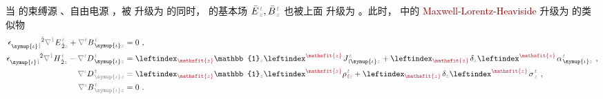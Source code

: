 当  的束缚源 、自由电源 ，被  升级为  的同时， 的基本场 $\bar{E}^{\;\!\mathcolor{gray}{t}}_{\;\!\mathcolor{gray}{z}}, \bar{B}^{\;\!\mathcolor{gray}{t}}_{\;\!\mathcolor{gray}{z}}$ 也被上面  升级为 。此时， 中的 \textcolor{Maroon}{Maxwell-Lorentz-Heaviside}  升级为  的类似物
\begin{subequations} \label{eq:curl-EH}
\begin{align}
	\epsilon^{\hphantom{\symup{\iota}\hat{1}}\hat{2}}_{\symup{\iota}\mathcolor{gray}{\hat{1}}} \mathcolor{gray}{\nabla^{\hat{1}}} E^{\;\!\mathcolor{gray}{t}}_{\;\! \hat{2}\mathcolor{gray}{z}} + \mathcolor{gray}{\nabla^t} B^{\;\!\mathcolor{gray}{t}}_{\;\! \symup{\iota}\mathcolor{gray}{z}} &= 0~, \label{eq:curl-E'duplicate} \\
	\epsilon^{\hphantom{\symup{\iota}\hat{1}}\hat{2}}_{\symup{\iota}\mathcolor{gray}{\hat{1}}} \mathcolor{gray}{\nabla^{\hat{1}}} H^{\;\!\mathcolor{gray}{t}}_{\;\! \hat{2}\mathcolor{gray}{z}} - \mathcolor{gray}{\nabla^t} D^{\;\!\mathcolor{gray}{t}}_{\;\! \symup{\iota}\mathcolor{gray}{z}} &= \leftindex_{\textcolor{Maroon}{\mathsfit{z}}} {\mathbb{1}}_{\mathcolor{gray}{z}} \leftindex^{\textcolor{Maroon}{\mathsfit{z}}} \;\! J^{\;\!\mathcolor{gray}{t}}_{\;\!\textcolor{Maroon}{\text{f}} \symup{\iota}\mathcolor{gray}{z}} + \leftindex_{\textcolor{Maroon}{\mathsfit{z}}} \;\! \delta_{\mathcolor{gray}{z}} \leftindex^{\textcolor{Maroon}{\mathsfit{z}}} \;\!
	{\alpha}^{\;\!\mathcolor{gray}{t}}_{\;\! \symup{\iota}\mathcolor{gray}{z}} ~, \label{eq:curl-H'} \\
	\mathcolor{gray}{\nabla^\iota} D^{\;\!\mathcolor{gray}{t}}_{\;\! \mathcolor{gray}{\symup{\iota}} \mathcolor{gray}{z}} &= \leftindex_{\textcolor{Maroon}{\mathsfit{z}}} {\mathbb{1}}_{\mathcolor{gray}{z}} \leftindex^{\textcolor{Maroon}{\mathsfit{z}}} {\rho}^{\;\!\mathcolor{gray}{t}}_{\;\!\textcolor{Maroon}{\text{f}}\mathcolor{gray}{z}} + \leftindex_{\textcolor{Maroon}{\mathsfit{z}}} \;\! \delta_{\mathcolor{gray}{z}} \leftindex^{\textcolor{Maroon}{\mathsfit{z}}} \;\! {\sigma}^{\;\!\mathcolor{gray}{t}}_{\;\! \mathcolor{gray}{z}}~, \label{eq:div-D'} \\
	\mathcolor{gray}{\nabla^\iota} B^{\;\!\mathcolor{gray}{t}}_{\;\! \mathcolor{gray}{\symup{\iota}} \mathcolor{gray}{z}} &= 0~. \label{eq:div-B'duplicate}
\end{align}
\end{subequations}

